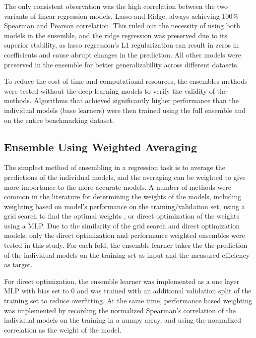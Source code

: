 The only consistent observation was the high correlation between the two variants of linear regression models, Lasso and Ridge, always achieving 100\% Spearman and Pearson correlation. This ruled out the necessity of using both models in the ensemble, and the ridge regression was preserved due to its superior stability, as lasso regression's L1 regularization can result in zeros in coefficients and cause abrupt changes in the prediction. All other models were preserved in the ensemble for better generalizability across different datasets.

To reduce the cost of time and computational resources, the ensembles methods were tested without the deep learning models to verify the validity of the methods. Algorithms that achieved significantly higher performance than the individual models (base learners) were then trained using the full ensemble and on the entire benchmarking dataset.

\subsection{Ensemble Using Weighted Averaging}

The simplest method of ensembling in a regression task is to average the predictions of the individual models, and the averaging can be weighted to give more importance to the more accurate models. A number of methods were common in the literature for determining the weights of the models, including weighting based on model's performance on the training/validation set\cite{fathiImprovingPrecipitationForecasts2019}, using a grid search to find the optimal weights \cite{anandWeightedAverageEnsemble2023}, or direct optimization of the weights using a MLP. Due to the similarity of the grid search and direct optimization models, only the direct optimization and performance weighted ensembles were tested in this study. For each fold, the ensemble learner takes the the prediction of the individual models on the training set as input and the measured efficiency as target. 

For direct optimization, the ensemble learner was implemented as a one layer MLP with bias set to 0 and was trained with an additional validation split of the training set to reduce overfitting. At the same time, performance based weighting was implemented by recording the normalized Spearman's correlation of the individual models on the training in a numpy array, and using the normalized correlation as the weight of the model.

